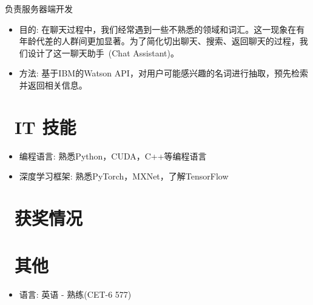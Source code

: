 \documentclass{resume}
\begin{document}
	 {负责服务器端开发}
	\begin{itemize}
		\item{目的: 在聊天过程中，我们经常遇到一些不熟悉的领域和词汇。这一现象在有年龄代差的人群间更加显著。为了简化切出聊天、搜索、返回聊天的过程，我们设计了这一聊天助手~(Chat Assistant)。}
		\item 方法: 基于IBM的Watson API，对用户可能感兴趣的名词进行抽取，预先检索并返回相关信息。
	\end{itemize}
	
	\section{\faCogs\ IT 技能}
	\begin{itemize}[parsep=0.5ex]
		\item 编程语言: 熟悉Python，CUDA，C++等编程语言
		\item 深度学习框架: 熟悉PyTorch，MXNet，了解TensorFlow
	\end{itemize}
	
	\section{\faHeartO\ 获奖情况}
	
	\section{\faInfo\ 其他}
	\begin{itemize}[parsep=0.5ex]
		\item 语言: 英语 - 熟练(CET-6 577)
	\end{itemize}
	
\end{document}
